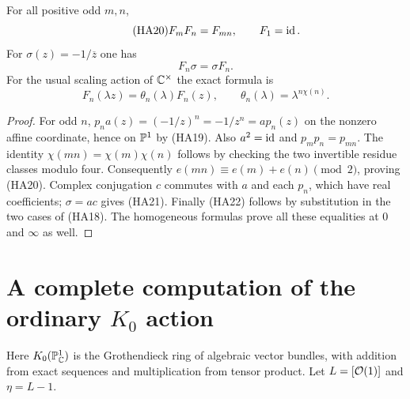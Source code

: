 \begin{theorem}
For all positive odd $m,n$,
\begin{equation}\tag{HA20}
 F_mF_n=F_{mn},\qquad F_1=\operatorname{id}.
\end{equation}
For $\sigma(z)=-1/\overline z$ one has
\begin{equation}\tag{HA21}
 F_n\sigma=\sigma F_n.
\end{equation}
For the usual scaling action of $\mathbb C^\times$ the exact formula is
\begin{equation}\tag{HA22}
 F_n(\lambda z)=\theta_n(\lambda)F_n(z),\qquad
 \theta_n(\lambda)=\lambda^{n\chi(n)}.
\end{equation}
\end{theorem}
\begin{proof}
For odd $n$, $p_na(z)=(-1/z)^n=-1/z^n=ap_n(z)$ on the
nonzero affine coordinate, hence on $\mathbb P^1$ by (HA19).
Also $a^2=\operatorname{id}$ and $p_mp_n=p_{mn}$. The identity
$\chi(mn)=\chi(m)\chi(n)$ follows by checking the two invertible
residue classes modulo four. Consequently
$e(mn)\equiv e(m)+e(n)\pmod2$, proving (HA20).
Complex conjugation $c$ commutes with $a$ and each $p_n$, which have
real coefficients; $\sigma=ac$ gives (HA21).
Finally (HA22) follows by substitution in the two cases of (HA18).
The homogeneous formulas prove all these equalities at $0$ and $\infty$
as well.
\end{proof}

\section{A complete computation of the ordinary \texorpdfstring{$K_0$}{K0} action}

Here $K_0(\mathbb P^1_\mathbb C)$ is the Grothendieck ring of algebraic vector bundles,
with addition from exact sequences and multiplication from tensor product.
Let $L=[\mathcal O(1)]$ and $\eta=L-1$.

